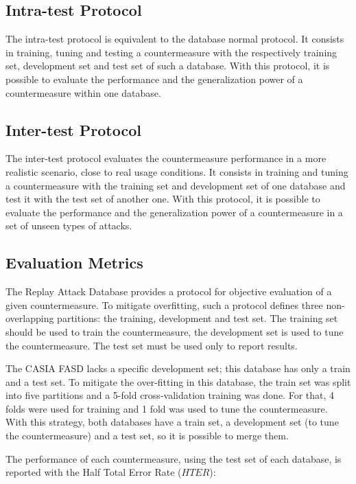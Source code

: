 \subsection{Intra-test Protocol}

The intra-test protocol is equivalent to the database normal protocol. It consists in training, tuning and testing a countermeasure with the respectively training set, development set and test set of such a database. With this protocol, it is possible to evaluate the performance and the generalization power of a countermeasure within one database. 

\subsection{Inter-test Protocol}

The inter-test protocol evaluates the countermeasure performance in a more realistic scenario, close to real usage conditions. It consists in training and tuning a countermeasure with the training set and development set of one database and test it with the test set of another one. With this protocol, it is possible to evaluate the performance and the generalization power of a countermeasure in a set of unseen types of attacks.


\subsection{Evaluation Metrics}

The Replay Attack Database provides a protocol for objective evaluation of a given countermeasure. To mitigate overfitting, such a protocol defines three non-overlapping partitions: the training, development and test set. The training set should be used to train the countermeasure, the development set is used to tune the countermeasure. The test set must be used only to report results. 

The CASIA FASD lacks a specific development set; this database has only a train and a test set. To mitigate the over-fitting in this database, the train set was split into five partitions and a 5-fold cross-validation training was done. For that, 4 folds were used for training and 1 fold was used to tune the countermeasure. With this strategy, both databases have a train set, a development set (to tune the countermeasure) and a test set, so it is possible to merge them.

The performance of each countermeasure, using the test set of each database, is reported with the Half Total Error Rate ($HTER$): 

